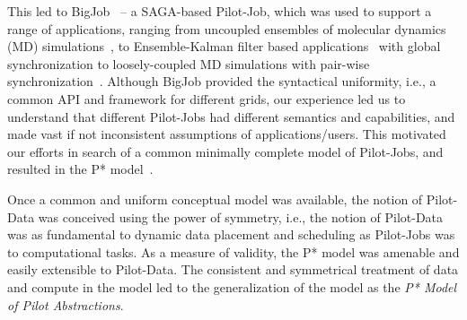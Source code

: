 \documentclass[times]{cpeauth}
\newcommand{\pilotjob}{Pilot-Job\xspace}
\newcommand{\pilotjobs}{Pilot-Jobs\xspace}
\newcommand{\pilotdata}{Pilot-Data\xspace}
\newcommand{\pstar}{P*\xspace}
\begin{document}
This led to BigJob~\cite{saga_bigjob_condor_cloud} -- a SAGA-based
\pilotjob, which was used to support a range of applications, ranging
from uncoupled ensembles of molecular dynamics (MD)
simulations~\cite{saga_bigjob_condor_cloud}, to Ensemble-Kalman filter
based applications~\cite{gmac09} with global synchronization to
loosely-coupled MD simulations with pair-wise
synchronization~\cite{async_repex11}.  Although BigJob provided the
syntactical uniformity, i.e., a common API and framework for different
grids, our experience led us to understand that different \pilotjobs
had different semantics and capabilities, and made vast if not
inconsistent assumptions of applications/users. This motivated our
efforts in search of a common minimally complete model of \pilotjobs,
and resulted in the \pstar model~\cite{pstar12}.

Once a common and uniform conceptual model was available, the notion
of \pilotdata was conceived using the power of symmetry, i.e., the
notion of \pilotdata was as fundamental to dynamic data placement and
scheduling as \pilotjobs was to computational tasks. As a measure of
validity, the \pstar model was amenable and easily extensible to
\pilotdata.  The consistent and symmetrical treatment of data and
compute in the model led to the generalization of the model as the
{\it P* Model of Pilot Abstractions}.

\end{document}
